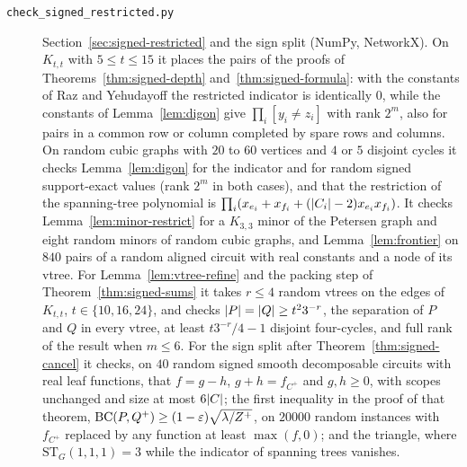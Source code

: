 \begin{description}
\item[\texttt{check\_signed\_restricted.py}] Section~\ref{sec:signed-restricted} and the sign split (NumPy, NetworkX). On $K_{t,t}$ with $5\le t\le15$ it places the pairs of the proofs of Theorems~\ref{thm:signed-depth} and~\ref{thm:signed-formula}: with the constants of Raz and Yehudayoff the restricted indicator is identically $0$, while the constants of Lemma~\ref{lem:digon} give $\prod_i[y_i\ne z_i]$ with rank $2^m$, also for pairs in a common row or column completed by spare rows and columns. On random cubic graphs with $20$ to $60$ vertices and $4$ or $5$ disjoint cycles it checks Lemma~\ref{lem:digon} for the indicator and for random signed support-exact values (rank $2^m$ in both cases), and that the restriction of the spanning-tree polynomial is $\prod_i(x_{e_i}+x_{f_i}+(\lvert C_i\rvert-2)x_{e_i}x_{f_i})$. It checks Lemma~\ref{lem:minor-restrict} for a $K_{3,3}$ minor of the Petersen graph and eight random minors of random cubic graphs, and Lemma~\ref{lem:frontier} on $840$ pairs of a random aligned circuit with real constants and a node of its vtree. For Lemma~\ref{lem:vtree-refine} and the packing step of Theorem~\ref{thm:signed-sums} it takes $r\le4$ random vtrees on the edges of $K_{t,t}$, $t\in\{10,16,24\}$, and checks $\lvert P\rvert=\lvert Q\rvert\ge t^23^{-r}$, the separation of $P$ and $Q$ in every vtree, at least $t3^{-r}/4-1$ disjoint four-cycles, and full rank of the result when $m\le6$. For the sign split after Theorem~\ref{thm:signed-cancel} it checks, on $40$ random signed smooth decomposable circuits with real leaf functions, that $f=g-h$, $g+h=f_{C^+}$ and $g,h\ge0$, with scopes unchanged and size at most $6\lvert C\rvert$; the first inequality in the proof of that theorem, $\mathrm{BC}(P,Q^+)\ge(1-\varepsilon)\sqrt{\lambda/Z^+}$, on $20000$ random instances with $f_{C^+}$ replaced by any function at least $\max(f,0)$; and the triangle, where $\mathrm{ST}_G(1,1,1)=3$ while the indicator of spanning trees vanishes.


\end{description}

